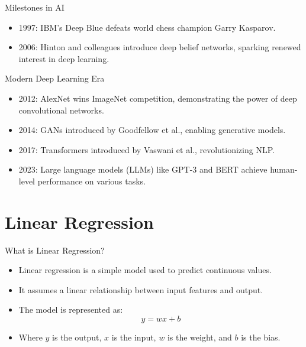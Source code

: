 \documentclass{beamer}
\begin{document}
\begin{frame}{Milestones in AI}
    \begin{itemize}
        \item 1997: IBM's Deep Blue defeats world chess champion Garry Kasparov.
        \item 2006: Hinton and colleagues introduce deep belief networks, sparking renewed interest in deep learning.
    \end{itemize}
\end{frame}

\begin{frame}{Modern Deep Learning Era}
    \begin{itemize}
        \item 2012: AlexNet wins ImageNet competition, demonstrating the power of deep convolutional networks.
        \item 2014: GANs introduced by Goodfellow et al., enabling generative models.
        \item 2017: Transformers introduced by Vaswani et al., revolutionizing NLP.
        \item 2023: Large language models (LLMs) like GPT-3 and BERT achieve human-level performance on various tasks.
    \end{itemize}
\end{frame}

\section{Linear Regression}
\begin{frame}{What is Linear Regression?}
    \begin{itemize}
        \item Linear regression is a simple model used to predict continuous values.
        \item It assumes a linear relationship between input features and output.
        \item The model is represented as:
        \[
        y = wx + b
        \]
        \item Where \(y\) is the output, \(x\) is the input, \(w\) is the weight, and \(b\) is the bias.
    \end{itemize}
\end{frame}
\end{document}
